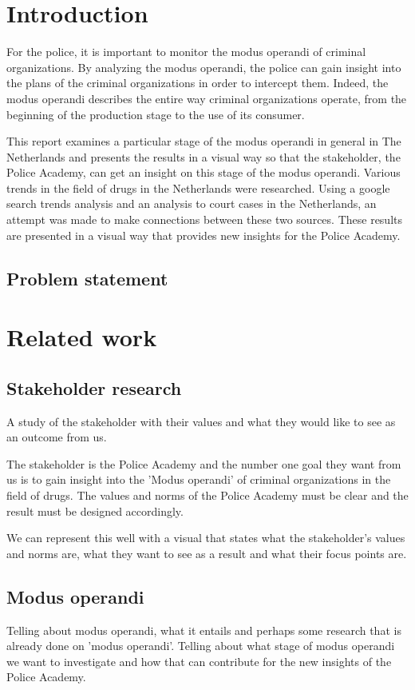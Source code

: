 \section{Introduction}
For the police, it is important to monitor the modus operandi of criminal organizations. By analyzing the modus operandi, the police can gain insight into the plans of the criminal organizations in order to intercept them. Indeed, the modus operandi describes the entire way criminal organizations operate, from the beginning of the production stage to the use of its consumer. 

This report examines a particular stage of the modus operandi in general in The Netherlands and presents the results in a visual way so that the stakeholder, the Police Academy, can get an insight on this stage of the modus operandi. 
Various trends in the field of drugs in the Netherlands were researched. Using a google search trends analysis and an analysis to court cases in the Netherlands, an attempt was made to make connections between these two sources. These results are presented in a visual way that provides new insights for the Police Academy.
\subsection{Problem statement}

\section{Related work}
\subsection{Stakeholder research}
A study of the stakeholder with their values and what they would like to see as an outcome from us. 

The stakeholder is the Police Academy and the number one goal they want from us is to gain insight into the 'Modus operandi' of criminal organizations in the field of drugs. The values and norms of the Police Academy must be clear and the result must be designed accordingly. 

We can represent this well with a visual that states what the stakeholder's values and norms are, what they want to see as a result and what their focus points are. 

\subsection{Modus operandi}
Telling about modus operandi, what it entails and perhaps some research that is already done on 'modus operandi'. Telling about what stage of modus operandi we want to investigate and how that can contribute for the new insights of the Police Academy.


